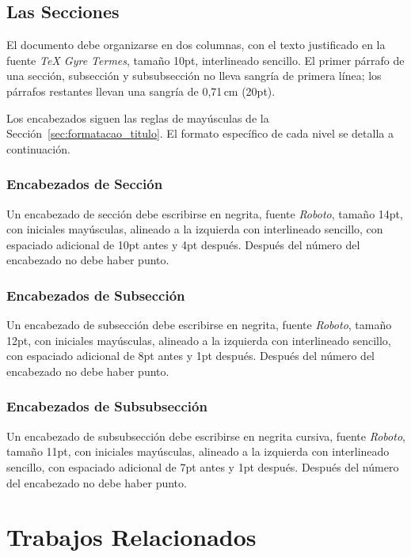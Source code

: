 \documentclass[spanish]{rbie2026}%
\begin{document}
\subsection{Las Secciones}

El documento debe organizarse en dos columnas, con el texto justificado en la fuente \textit{TeX Gyre Termes}, tamaño 10pt, interlineado sencillo. El primer párrafo de una sección, subsección y subsubsección no lleva sangría de primera línea; los párrafos restantes llevan una sangría de 0,71\,cm (20pt).

Los encabezados siguen las reglas de mayúsculas de la Sección~\ref{sec:formatacao_titulo}. El formato específico de cada nivel se detalla a continuación.


\subsubsection{Encabezados de Sección}

Un encabezado de sección debe escribirse en negrita, fuente \textit{Roboto}, tamaño 14pt, con iniciales mayúsculas, alineado a la izquierda con interlineado sencillo, con espaciado adicional de 10pt antes y 4pt después. Después del número del encabezado no debe haber punto.

\subsubsection{Encabezados de Subsección}

Un encabezado de subsección debe escribirse en negrita, fuente \textit{Roboto}, tamaño 12pt, con iniciales mayúsculas, alineado a la izquierda con interlineado sencillo, con espaciado adicional de 8pt antes y 1pt después. Después del número del encabezado no debe haber punto.

\subsubsection{Encabezados de Subsubsección}

Un encabezado de subsubsección debe escribirse en negrita cursiva, fuente \textit{Roboto}, tamaño 11pt, con iniciales mayúsculas, alineado a la izquierda con interlineado sencillo, con espaciado adicional de 7pt antes y 1pt después. Después del número del encabezado no debe haber punto.



\section{Trabajos Relacionados}
\label{sec:related-work}
\end{document}

